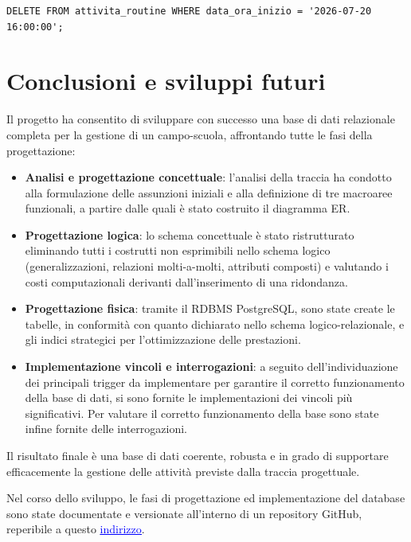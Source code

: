 \documentclass[11pt,a4paper]{article}
\begin{document}
\begin{verbatim}
DELETE FROM attivita_routine WHERE data_ora_inizio = '2026-07-20 16:00:00';
\end{verbatim}


\section{Conclusioni e sviluppi futuri}

Il progetto ha consentito di sviluppare con successo una base di dati relazionale completa per
la gestione di un campo-scuola, affrontando tutte le fasi della progettazione:

\begin{itemize}[nosep]
  \item \textbf{Analisi e progettazione concettuale}: l'analisi della traccia ha condotto alla
    formulazione delle assunzioni iniziali e alla definizione di tre macroaree funzionali, a
    partire dalle quali è stato costruito il diagramma ER.
  \item \textbf{Progettazione logica}: lo schema concettuale è stato ristrutturato eliminando
    tutti i costrutti non esprimibili nello schema logico (generalizzazioni, relazioni
    molti-a-molti, attributi composti) e valutando i costi computazionali derivanti
    dall'inserimento di una ridondanza.
  \item \textbf{Progettazione fisica}: tramite il RDBMS PostgreSQL, sono state create le
    tabelle, in conformità con quanto dichiarato nello schema logico-relazionale, e gli indici
    strategici per l'ottimizzazione delle prestazioni.
  \item \textbf{Implementazione vincoli e interrogazioni}: a seguito dell'individuazione dei
    principali trigger da implementare per garantire il corretto funzionamento della base di
    dati, si sono fornite le implementazioni dei vincoli più significativi. Per valutare il
    corretto funzionamento della base sono state infine fornite delle interrogazioni.
\end{itemize}

Il risultato finale è una base di dati coerente, robusta e in grado di supportare efficacemente
la gestione delle attività previste dalla traccia progettuale.

Nel corso dello sviluppo, le fasi di progettazione ed implementazione del database sono state 
documentate e versionate all'interno di un repository GitHub, reperibile a questo \href{https://github.com/JoshuaRumiato/paisapack}{\textcolor{blue}{\underline{indirizzo}}}.
\end{document}
